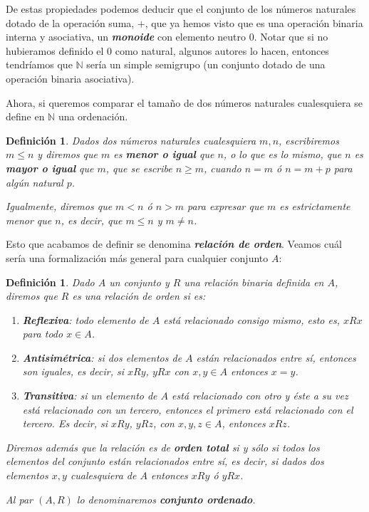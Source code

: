 \documentclass[12pt]{article}
\newtheorem{definition}[theorem]{Definición}
\begin{document}
De estas propiedades podemos deducir que el conjunto de los números naturales dotado de la operación suma, $+$, que ya hemos visto que es una operación binaria interna y asociativa, un \textbf{\textit{monoide}} con elemento neutro $0$. Notar que si no hubieramos definido el $0$ como natural, algunos autores lo hacen, entonces tendríamos que $\mathbb{N}$ sería un simple semigrupo (un conjunto dotado de una operación binaria asociativa).

Ahora, si queremos comparar el tamaño de dos números naturales cualesquiera se define en $\mathbb{N}$ una ordenación.

\begin{definition}Dados dos números naturales cualesquiera $m,n$, escribiremos $m \leq n$ y diremos que $m$ es \textbf{\textit{menor o igual}} que $n$, o lo que es lo mismo, que $n$ es \textbf{\textit{mayor o igual}} que $m$, que se escribe $n \geq m$, cuando $n = m$ ó $n = m+p$ para algún natural $p$.

Igualmente, diremos que $m < n$ ó $n>m$ para expresar que $m$ es estrictamente menor que $n$, es decir, que $m \leq n$ y $m \neq n$.
\end{definition}

Esto que acabamos de definir se denomina \textbf{\textit{relación de orden}}. Veamos cuál sería una formalización más general para cualquier conjunto $A$:

\begin{definition}Dado $A$ un conjunto y $R$ una relación binaria definida en $A$, diremos que $R$ es una relación de orden si es:
\begin{enumerate}
\item \textbf{Reflexiva}: todo elemento de $A$ está relacionado consigo mismo, esto es, $xRx$ para todo $x \in A$.
\item \textbf{Antisimétrica}: si dos elementos de $A$ están relacionados entre sí, entonces son iguales, es decir, si $xRy$, $yRx$ con $x,y \in A$ entonces $x=y$.
\item \textbf{Transitiva}: si un elemento de $A$ está relacionado con otro y éste a su vez está relacionado con un tercero, entonces el primero está relacionado con el tercero. Es decir, si $xRy$, $yRz$, con $x,y,z \in A$, entonces $xRz$.
\end{enumerate}
Diremos además que la relación es de \textbf{orden total} si y sólo si todos los elementos del conjunto están relacionados entre sí, es decir, si dados dos elementos $x,y$ cualesquiera de $A$ entonces $xRy$ ó $yRx$.

Al par $(A, R)$ lo denominaremos \textbf{conjunto ordenado}.
\end{definition}
\end{document}
